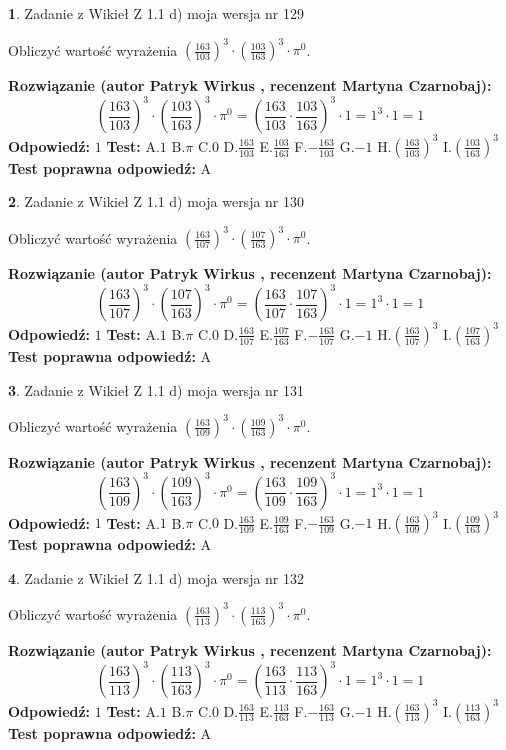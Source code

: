 \documentclass[12pt, a4paper]{article}
\theoremstyle{definition} %
\newtheorem{zad}{}
\newcommand{\zadStart}[1]{\begin{zad}#1\newline}
\newcommand{\zadStop}{\end{zad}}
\newcommand{\rozwStart}[2]{\noindent \textbf{Rozwiązanie (autor #1 , recenzent #2): }\newline}
\newcommand{\rozwStop}{\newline}
\newcommand{\odpStart}{\noindent \textbf{Odpowiedź:}\newline}
\newcommand{\odpStop}{\newline}
\newcommand{\testStart}{\noindent \textbf{Test:}\newline}
\newcommand{\testStop}{\newline}
\newcommand{\kluczStart}{\noindent \textbf{Test poprawna odpowiedź:}\newline}
\newcommand{\kluczStop}{\newline}
\begin{document}
\zadStart{Zadanie z Wikieł Z 1.1 d) moja wersja nr 129}

Obliczyć wartość wyrażenia $(\frac{163}{103})^{3} \cdot (\frac{103}{163})^{3} \cdot \pi^{0}$.
\zadStop
\rozwStart{Patryk Wirkus}{Martyna Czarnobaj}
$$(\frac{163}{103})^{3} \cdot (\frac{103}{163})^{3} \cdot \pi^{0} = (\frac{163}{103} \cdot \frac{103}{163})^{3} \cdot 1 = 1^{3} \cdot 1 = 1$$
\rozwStop
\odpStart
$1$
\odpStop
\testStart
A.$1$ B.$\pi$ C.$0$ D.$\frac{163}{103}$ E.$\frac{103}{163}$
F.$-\frac{163}{103}$ G.$-1$
H.$(\frac{163}{103})^{3}$
I.$(\frac{103}{163})^{3}$
\testStop
\kluczStart
A
\kluczStop



\zadStart{Zadanie z Wikieł Z 1.1 d) moja wersja nr 130}

Obliczyć wartość wyrażenia $(\frac{163}{107})^{3} \cdot (\frac{107}{163})^{3} \cdot \pi^{0}$.
\zadStop
\rozwStart{Patryk Wirkus}{Martyna Czarnobaj}
$$(\frac{163}{107})^{3} \cdot (\frac{107}{163})^{3} \cdot \pi^{0} = (\frac{163}{107} \cdot \frac{107}{163})^{3} \cdot 1 = 1^{3} \cdot 1 = 1$$
\rozwStop
\odpStart
$1$
\odpStop
\testStart
A.$1$ B.$\pi$ C.$0$ D.$\frac{163}{107}$ E.$\frac{107}{163}$
F.$-\frac{163}{107}$ G.$-1$
H.$(\frac{163}{107})^{3}$
I.$(\frac{107}{163})^{3}$
\testStop
\kluczStart
A
\kluczStop



\zadStart{Zadanie z Wikieł Z 1.1 d) moja wersja nr 131}

Obliczyć wartość wyrażenia $(\frac{163}{109})^{3} \cdot (\frac{109}{163})^{3} \cdot \pi^{0}$.
\zadStop
\rozwStart{Patryk Wirkus}{Martyna Czarnobaj}
$$(\frac{163}{109})^{3} \cdot (\frac{109}{163})^{3} \cdot \pi^{0} = (\frac{163}{109} \cdot \frac{109}{163})^{3} \cdot 1 = 1^{3} \cdot 1 = 1$$
\rozwStop
\odpStart
$1$
\odpStop
\testStart
A.$1$ B.$\pi$ C.$0$ D.$\frac{163}{109}$ E.$\frac{109}{163}$
F.$-\frac{163}{109}$ G.$-1$
H.$(\frac{163}{109})^{3}$
I.$(\frac{109}{163})^{3}$
\testStop
\kluczStart
A
\kluczStop



\zadStart{Zadanie z Wikieł Z 1.1 d) moja wersja nr 132}

Obliczyć wartość wyrażenia $(\frac{163}{113})^{3} \cdot (\frac{113}{163})^{3} \cdot \pi^{0}$.
\zadStop
\rozwStart{Patryk Wirkus}{Martyna Czarnobaj}
$$(\frac{163}{113})^{3} \cdot (\frac{113}{163})^{3} \cdot \pi^{0} = (\frac{163}{113} \cdot \frac{113}{163})^{3} \cdot 1 = 1^{3} \cdot 1 = 1$$
\rozwStop
\odpStart
$1$
\odpStop
\testStart
A.$1$ B.$\pi$ C.$0$ D.$\frac{163}{113}$ E.$\frac{113}{163}$
F.$-\frac{163}{113}$ G.$-1$
H.$(\frac{163}{113})^{3}$
I.$(\frac{113}{163})^{3}$
\testStop
\kluczStart
A
\kluczStop
\end{document}
